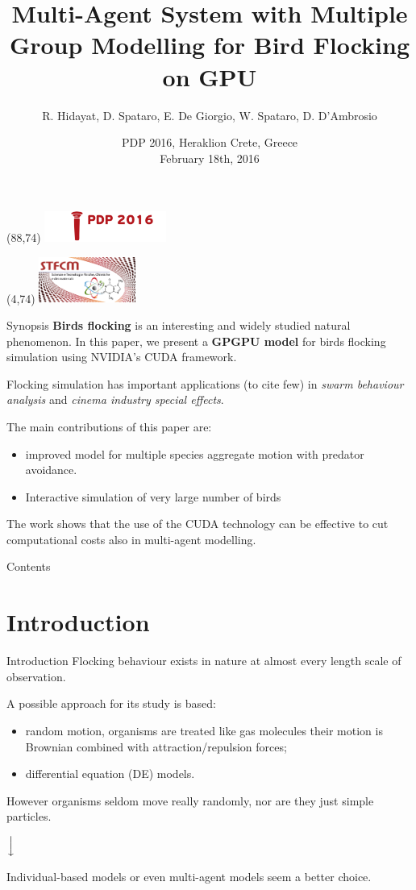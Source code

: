 \documentclass{beamer}
\title[The ACIADDRI model]{Multi-Agent System with Multiple Group Modelling
for Bird Flocking on GPU}
\author{R. Hidayat\inst{1}, D. Spataro, E. De Giorgio, W. Spataro, D. D'Ambrosio\inst{2}}
\institute[shortinst]{\inst{1} BPJS Kesehatan, Indonesia \and %
	\inst{2} University of Calabria, Department of Mathematics and Computer Science}
\date{PDP 2016,  Heraklion Crete, Greece \\
February 18th, 2016}
\newcommand{\MyLogo}{%
\begin{textblock}{13}(88,74)
 \includegraphics[height=1cm, angle=0]{images/pdp2016}
\end{textblock}
}
\newcommand{\MyLogoo}{%
\begin{textblock}{15}(4,74)
 \includegraphics[height=1.5cm, angle=0]{images/logo1}
\end{textblock}
}
\begin{document}
\begin{frame}
\MyLogo
\MyLogoo
\titlepage
\end{frame}

\begin{frame}{Synopsis}
\textbf{Birds flocking} is an interesting and widely studied natural phenomenon. In this paper, we present a \textbf{GPGPU model} for birds flocking simulation using NVIDIA's CUDA framework. 

Flocking simulation has important applications (to cite few) in \textit{swarm behaviour analysis} and \textit{cinema industry special effects}.

The main contributions of this paper are:
\begin{itemize}
\item improved model for multiple species aggregate motion with predator avoidance.
\item  Interactive simulation of very large number of birds
\end{itemize} 

The work shows that the use of the CUDA technology can be effective to cut computational costs also in multi-agent modelling.
\end{frame}

\begin{frame}{Contents}
\tableofcontents
\end{frame}

\section{Introduction}
\begin{frame}{Introduction}
 Flocking behaviour exists in nature at almost every length scale of observation.

A possible approach for its study is based:
\begin{itemize}
\item random motion, organisms are treated like gas molecules their motion is Brownian combined with attraction/repulsion forces;
\item differential equation (DE) models.
\end{itemize}
However organisms seldom move really randomly, nor are they just
simple particles. 
\begin{center}
$\Big{\downarrow}$ 
\end{center}

Individual-based models or even multi-agent models seem a
better choice.  
\end{frame}
\end{document}
